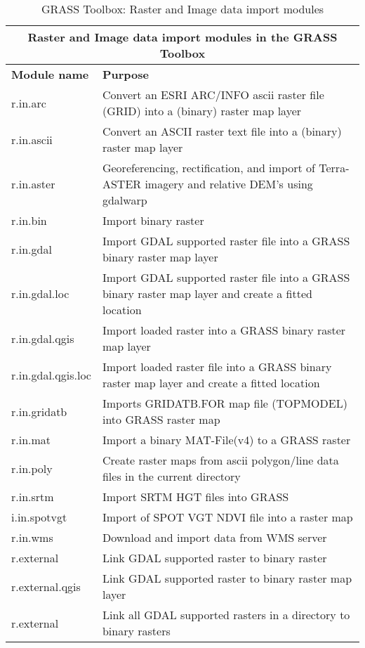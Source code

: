 \begin{table}[ht]
\centering
\caption{GRASS Toolbox: Raster and Image data import modules}\medskip
 \begin{tabular}{|p{4cm}|p{12cm}|}
  \hline \multicolumn{2}{|c|}{\textbf{Raster and Image data import modules in the GRASS
  Toolbox}} \\ 
  \hline \textbf{Module name} & \textbf{Purpose} \\
  \hline r.in.arc & Convert an ESRI ARC/INFO ascii raster file (GRID) into a
  (binary) raster map layer\\
  \hline r.in.ascii & Convert an ASCII raster text file into a (binary)
  raster map layer \\
  \hline r.in.aster & Georeferencing, rectification, and import of
  Terra-ASTER imagery and relative DEM's using gdalwarp \\
  \hline r.in.bin & Import binary raster \\
  \hline r.in.gdal &  Import GDAL supported raster file into a GRASS binary
  raster map layer \\
  \hline r.in.gdal.loc &  Import GDAL supported raster file into a GRASS
  binary raster map layer and create a fitted location \\
  \hline r.in.gdal.qgis & Import loaded raster into a GRASS binary raster map
  layer \\
  \hline r.in.gdal.qgis.loc &  Import loaded raster file into a GRASS binary
  raster map layer and create a fitted location \\
  \hline r.in.gridatb & Imports GRIDATB.FOR map file (TOPMODEL) into GRASS
  raster map \\
  \hline r.in.mat  & Import a binary MAT-File(v4) to a GRASS raster  \\
  \hline r.in.poly  &  Create raster maps from ascii polygon/line data files
  in the current directory \\
  \hline r.in.srtm  & Import SRTM HGT files into GRASS \\
  \hline i.in.spotvgt & Import of SPOT VGT NDVI file into a raster map \\
  \hline r.in.wms & Download and import data from WMS server \\
  \hline r.external & Link GDAL supported raster to binary raster \\
  \hline r.external.qgis & Link GDAL supported raster to binary raster map layer \\
  \hline r.external & Link all GDAL supported rasters in a directory to binary rasters  \\
  \hline
\end{tabular}
\end{table}

